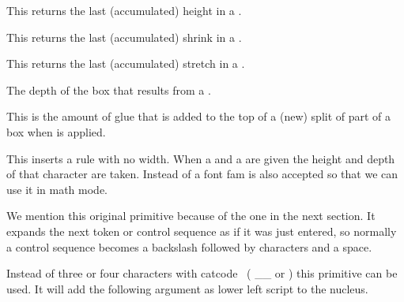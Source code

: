 \stopnewprimitive

\startnewprimitive[title={\prm {splitlastheight}}]

This returns the last (accumulated) height in a .

\stopnewprimitive

\startnewprimitive[title={\prm {splitlastshrink}}]

This returns the last (accumulated) shrink in a .

\stopnewprimitive

\startnewprimitive[title={\prm {splitlaststretch}}]

This returns the last (accumulated) stretch in a .

\stopnewprimitive

\startoldprimitive[title={\prm {splitmaxdepth}}]

The depth of the box that results from a .

\stopoldprimitive

\startoldprimitive[title={\prm {splittopskip}}]

This is the amount of glue that is added to the top of a (new) split of part of a
box when  is applied.

\stopoldprimitive

\startnewprimitive[title={\prm {srule}}]

This inserts a rule with no width. When a  and a  are
given the height and depth of that character are taken. Instead of a font \type
{fam} is also accepted so that we can use it in math mode.

\stopnewprimitive

\startoldprimitive[title={\prm {string}}]

We mention this original primitive because of the one in the next section. It
expands the next token or control sequence as if it was just entered, so normally
a control sequence becomes a backslash followed by characters and a space.

\stopoldprimitive

\startnewprimitive[title={\prm {subprescript}}]

Instead of three or four characters with catcode \the\subscriptcatcode\ (\type
{__} or \type {____}) this primitive can be used. It will add the following
argument as lower left script to the nucleus.

\stopnewprimitive

\startnewprimitive[title={\prm {subscript}}]


